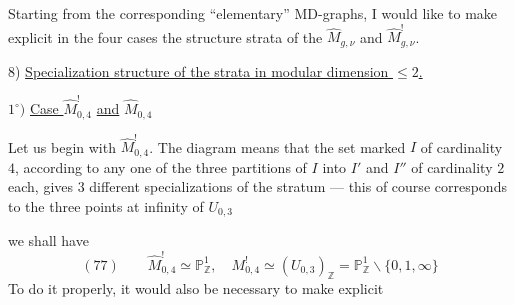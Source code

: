 Starting from the corresponding ``elementary'' MD-graphs, I would like to make explicit in the four cases the structure  strata of the $\widehat M_{g,\nu}$ and $\widehat M^!_{g,\nu}$.

8) \uline{Specialization structure of the strata in modular dimension $\leq2$.}

$1^\circ)$ \uline{Case } $\widehat M^!_{0,4}$ \uline{and} $\widehat M_{0,4}$

Let us begin with $\widehat M^!_{0,4}$.
The diagram means that the set marked $I$ of cardinality $4$,  according to any one of the three partitions of $I$ into $I'$ and $I''$ of cardinality $2$ each, gives $3$ different specializations of the  stratum --- this of course corresponds to the three points at infinity of $U_{0,3}$

we shall have
\[
(77)\qquad \widehat M^!_{0,4}\simeq\mathbb P^1_{\mathbb Z},\quad M^!_{0,4}\simeq(U_{0,3})_{\mathbb Z}=\mathbb P^1_{\mathbb Z}\smallsetminus\{0,1,\infty\}
\]
To do it properly, it would also be necessary to make explicit
